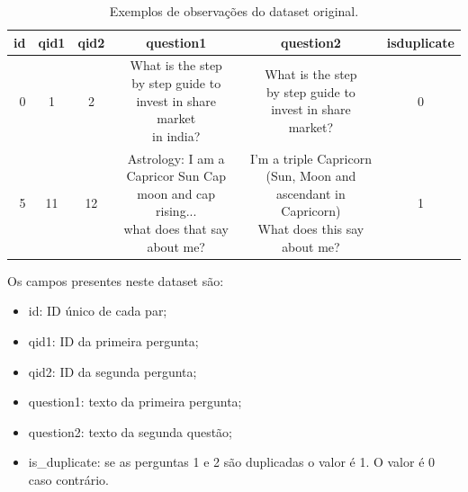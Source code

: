 \documentclass[conference]{IEEEtran}
\begin{document}
\begin{table}[]
\captionsetup{}
\caption{Exemplos de observações do dataset original.} \label{tab:freq}
\setlength\tabcolsep{0pt} %
\footnotesize\centering

\smallskip 
\begin{tabular*}{\columnwidth}{@{\extracolsep{\fill}}rccccc}
\toprule
  id & qid1 & qid2 & question1 & question2 & isduplicate \\
\midrule
  0 & 1 & 2 &
   \pbox{10cm}{What is the step \\ by step guide to \\ invest in share market \\ in india?\\} &
  \pbox{10cm}{What is the step \\ by step guide to \\ invest in share market?\\} &
  0 \\
  
  5 & 11 & 12 &
  \pbox{10cm}{Astrology: I am a \\ Capricor Sun Cap \\ moon and cap rising... \\ what does that say \\ about me?\\} &
  \pbox{10cm}{I'm a triple Capricorn \\ (Sun, Moon and \\ ascendant in Capricorn) \\ What does this say \\ about me?\\} &
  1 \\ \hline
\bottomrule
\end{tabular*}
\end{table}

Os campos presentes neste dataset são:
\begin{itemize}
\item id: ID único de cada par;
\item qid1: ID da primeira pergunta;
\item qid2: ID da segunda pergunta;
\item question1: texto da primeira pergunta;
\item question2: texto da segunda questão;
\item is\_duplicate: se as perguntas 1 e 2 são duplicadas o valor é 1. O valor é 0 caso contrário. 
\end{itemize}
\end{document}
